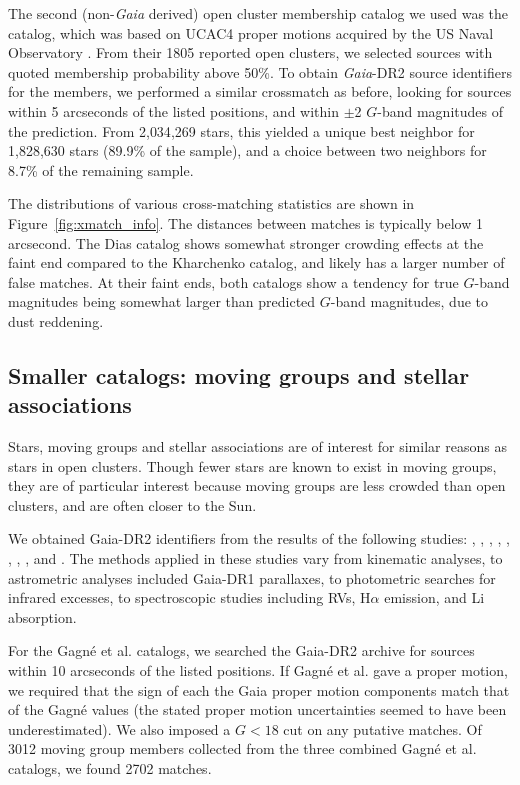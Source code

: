 \documentclass[12pt,twocolumn,tighten]{aastex62}
\begin{document}
The second (non-{\it Gaia} derived) open cluster membership catalog we
used was the \citet{dias_proper_2014} catalog, which was based on
UCAC4 proper motions acquired by the US Naval Observatory
\citep{zacharias_fourth_2013}.
From their 1805 reported open clusters, we selected sources with
quoted membership probability above 50\%.
To obtain {\it Gaia}-DR2 source identifiers for the members, we
performed a similar crossmatch as before, looking for sources within 5
arcseconds of the listed positions, and within $\pm$2 $G$-band
magnitudes of the prediction.
From 2{,}034{,}269 stars, this yielded a unique
best neighbor for 1{,}828{,}630 stars (89.9\% of the sample), and a choice
between two neighbors for 8.7\% of the remaining sample. 

The distributions of various cross-matching statistics are shown in
Figure~\ref{fig:xmatch_info}.  The distances between matches is
typically below 1 arcsecond.  The Dias catalog shows somewhat stronger
crowding effects at the faint end compared to the Kharchenko catalog,
and likely has a larger number of false matches.
At their faint ends, both catalogs show a tendency for true $G$-band
magnitudes being somewhat larger than predicted $G$-band magnitudes,
due to dust reddening.


\subsection{Smaller catalogs: moving groups and stellar associations}
\label{subsec:mg}

Stars, moving groups and stellar associations are of interest for
similar reasons as stars in open clusters.  Though fewer stars
are known to exist in moving groups, they are of particular interest
because moving groups are less crowded than open clusters, and are
often closer to the Sun.

We obtained Gaia-DR2 identifiers from the results of the following
studies:
\citet{gagne_banyan_XI_2018},
\citet{gagne_banyan_XII_2018},
\citet{gagne_banyan_XIII_2018},
\citet{kraus_tucanahor_2014},
\citet{roser_deep_2011}, %
\citet{bell_32ori_2017},
\citet{rizzuto_multidimensional_2011},
\citet{oh_comoving_2017}, and
\citet{zari_3d_2018}. The methods applied in these studies
vary from kinematic analyses, to astrometric analyses included
Gaia-DR1 parallaxes, to photometric searches for infrared excesses, to
spectroscopic studies including RVs, H$\alpha$
emission, and Li absorption.

For the Gagn\'e et al{.} catalogs, we searched the Gaia-DR2 archive for
sources within 10 arcseconds of the listed positions.  If Gagn\'e et
al{.} gave a proper motion, we required that the sign of each the Gaia
proper motion components match that of the Gagn\'e values (the stated
proper motion uncertainties seemed to have been underestimated).  We
also imposed a $G<18$ cut on any putative matches.  Of 3012 moving
group members collected from the three combined Gagn\'e et al{.}
catalogs, we found 2702 matches.
\end{document}

